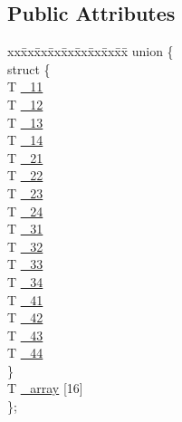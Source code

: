 \subsection*{Public Attributes}
\begin{CompactItemize}
\item 
\begin{tabbing}
xx\=xx\=xx\=xx\=xx\=xx\=xx\=xx\=xx\=\kill
union \{\\
\>struct \{\\
\>\>T \hyperlink{classnv_1_1matrix4_5fbda38eab1e83ec03072c35ce446f23}{\_11}\\
\>\>T \hyperlink{classnv_1_1matrix4_2f77d39c6fef6e44fe51f942dbeae1ad}{\_12}\\
\>\>T \hyperlink{classnv_1_1matrix4_6b77bf7df000c2da8b10cdfb707496d3}{\_13}\\
\>\>T \hyperlink{classnv_1_1matrix4_2cd5b3fd361e5520b366f499d56bc31f}{\_14}\\
\>\>T \hyperlink{classnv_1_1matrix4_bfd2c00d09f2c94359fa75e034a9d365}{\_21}\\
\>\>T \hyperlink{classnv_1_1matrix4_236e012222dca1ae40ca9de68b6890d1}{\_22}\\
\>\>T \hyperlink{classnv_1_1matrix4_4e2177512a4e3ea9b6d8584ce73ce724}{\_23}\\
\>\>T \hyperlink{classnv_1_1matrix4_7bd4413efb39c6cfb52e24e1019ecedc}{\_24}\\
\>\>T \hyperlink{classnv_1_1matrix4_585382c55b5ba7921a7c55d0b51fdeb2}{\_31}\\
\>\>T \hyperlink{classnv_1_1matrix4_27391693b9cbccd400083e46265d8086}{\_32}\\
\>\>T \hyperlink{classnv_1_1matrix4_f6ea4c219063a6eff57bcb7f669bcdd2}{\_33}\\
\>\>T \hyperlink{classnv_1_1matrix4_0092ee1a4e828a55838566dec4e90b77}{\_34}\\
\>\>T \hyperlink{classnv_1_1matrix4_52d24ada375affd41f8502bace352327}{\_41}\\
\>\>T \hyperlink{classnv_1_1matrix4_abc0ff6800ec83b672608ac0d5589a32}{\_42}\\
\>\>T \hyperlink{classnv_1_1matrix4_ebd9a2934f01f79339dd1ec8e2acbff5}{\_43}\\
\>\>T \hyperlink{classnv_1_1matrix4_d3ea6d1a8729755662f0e3b2e4454d8c}{\_44}\\
\>\} \\
\>T \hyperlink{classnv_1_1matrix4_a756b9f94bc522d9e68ce13c0a71f312}{\_array} \mbox{[}16\mbox{]}\\
\}; \\

\end{tabbing}\end{CompactItemize}
